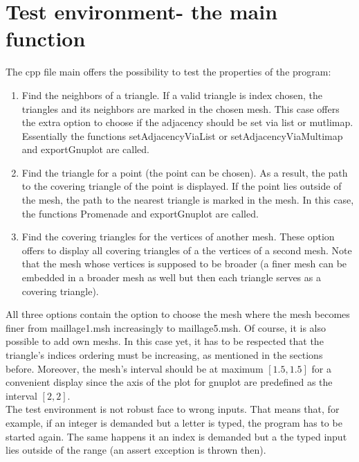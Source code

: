 \documentclass[10pt]{article}
\begin{document}
\section{Test environment- the main function}
	The cpp file main offers the possibility to test the properties of the program:
	\begin{enumerate}
		\item 
		Find the neighbors of a triangle.
		If a valid triangle is index chosen, the triangles and its neighbors are marked in the chosen mesh. This case offers the extra option to choose if the adjacency should be set via list or mutlimap. Essentially the functions 
		{\ttfamily setAdjacencyViaList } or {\ttfamily setAdjacencyViaMultimap} and {\ttfamily exportGnuplot} are called. 
		\item 
		Find the triangle for a point (the point can be chosen). 
		As a result, the path to the covering triangle of the point is displayed. 
		If the point lies outside of the mesh, the path to the nearest triangle is marked in the mesh. 
		In this case, the functions {\ttfamily Promenade} and {\ttfamily exportGnuplot} are called. 
		\item 
		Find the covering triangles for the vertices of another mesh. These option offers to display all covering triangles of a the vertices of a second mesh. Note that the mesh whose vertices is supposed to be broader (a finer mesh can be embedded in a broader mesh as well but then each triangle serves as a covering triangle).
	\end{enumerate}
	All three options contain the option to choose the mesh where the mesh becomes finer from maillage1.msh increasingly to maillage5.msh. 
	Of course, it is also possible to add own meshs. In this case yet, it has to be respected that the triangle's indices ordering must be increasing, as mentioned in the sections before. 
	Moreover, the mesh's interval should be at maximum $ [1.5,1.5] $ for a convenient display since the axis of the plot for gnuplot are predefined as the interval $ [2,2] $.  \\
	The test environment is not robust face to wrong inputs. That means that, for example, if an integer is demanded but a letter is typed, the program has to be started again. The same happens it an index is demanded but a the typed input lies outside of the range (an assert exception is thrown then).  
	
	
\end{document}

